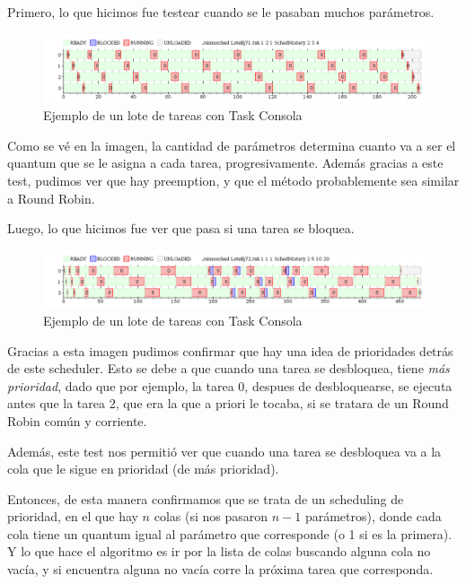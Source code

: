 
Primero, lo que hicimos fue testear cuando se le pasaban muchos parámetros.

\begin{figure}[H]
\caption{Ejemplo de un lote de tareas con Task Consola}
\label{fig:ej71}
\includegraphics[width=1\textwidth]{imgs/ej7-1.png}
\end{figure}

Como se vé en la imagen, la cantidad de parámetros determina cuanto va a ser el quantum que se le asigna a cada tarea, progresivamente. Además gracias a este test, pudimos ver que hay preemption, y que el método probablemente sea similar a Round Robin.


Luego, lo que hicimos fue ver que pasa si una tarea se bloquea.

\begin{figure}[H]
\caption{Ejemplo de un lote de tareas con Task Consola}
\label{fig:ej72}
\includegraphics[width=1\textwidth]{imgs/ej7-2.png}
\end{figure}

Gracias a esta imagen pudimos confirmar que hay una idea de prioridades detrás de este scheduler. Esto se debe a que cuando una tarea se desbloquea, tiene \emph{más prioridad}, dado que por ejemplo, la tarea 0, despues de desbloquearse, se ejecuta antes que la tarea 2, que era la que a priori le tocaba, si se tratara de un Round Robin común y corriente.

Además, este test nos permitió ver que cuando una tarea se desbloquea va a la cola que le sigue en prioridad (de más prioridad).


Entonces, de esta manera confirmamos que se trata de un scheduling de prioridad, en el que hay $n$ colas (si nos pasaron $n-1$ parámetros), donde cada cola tiene un quantum igual al parámetro que corresponde (o 1 si es la primera). Y lo que hace el algoritmo es ir por la lista de colas buscando alguna cola no vacía, y si encuentra alguna no vacía corre la próxima tarea que corresponda.

